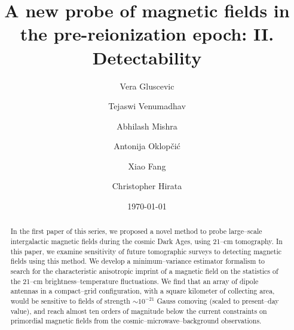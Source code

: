 \documentclass[aps,prd,twocolumn,floatfix,showpacs,superscriptaddress,nofootinbib]{revtex4-1}
\begin{document}
\widetext    
\title{A new probe of magnetic fields in the pre-reionization epoch: II. Detectability}
\author{Vera Gluscevic}
\author{Tejaswi Venumadhav}
\author{Abhilash Mishra} 
\author{Antonija Oklop\v ci\' c}
\author{Xiao Fang}
\author{Christopher Hirata}
\date{\today}
    

\begin{abstract} 
In the first paper of this series, we proposed a novel method to probe large--scale intergalactic magnetic fields during the cosmic Dark Ages, using 21--cm tomography. In this paper, we examine sensitivity of future tomographic surveys to detecting magnetic fields using this method. We develop a minimum--variance estimator formalism to search for the characteristic anisotropic imprint of a magnetic field on the statistics of the 21--cm brightness--temperature fluctuations. We find that an array of dipole antennas in a compact--grid configuration, with a square kilometer of collecting area, would be sensitive to fields of strength $\sim 10^{-21}$ Gauss comoving (scaled to present--day value), and reach almost ten orders of magnitude below the current constraints on primordial magnetic fields from the cosmic--microwave--background observations. 
\end{abstract} 
    
\pacs{} 
\maketitle







  
\appendix 

\label{app:Vrms} 

\label{app:fesc}

\label{app:lensing}



\end{document}
